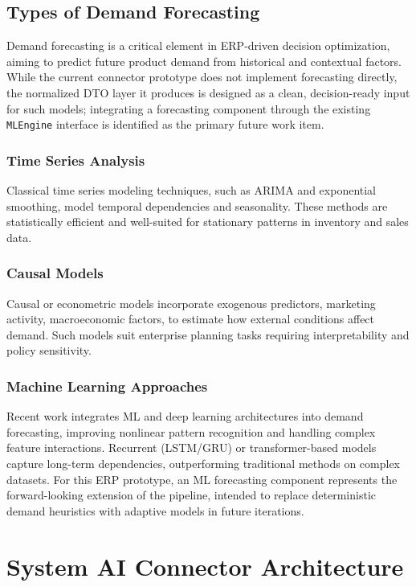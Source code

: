 \documentclass{article}
\begin{document}
\subsection{Types of Demand Forecasting}
Demand forecasting is a critical element in ERP-driven decision optimization, aiming to predict
future product demand from historical and contextual factors.
While the current connector prototype does not implement forecasting directly, the normalized
DTO layer it produces is designed as a clean, decision-ready input for such models; integrating
a forecasting component through the existing \texttt{MLEngine} interface is identified as the
primary future work item.

\subsubsection{Time Series Analysis}
Classical time series modeling techniques, such as ARIMA and exponential smoothing, model
temporal dependencies and seasonality.\autocite{hyndman2018forecasting}
These methods are statistically efficient and well-suited for stationary patterns in inventory
and sales data.

\subsubsection{Causal Models}
Causal or econometric models incorporate exogenous predictors, marketing activity,
macroeconomic factors, to estimate how external conditions affect demand.\autocite{stock2001vector}
Such models suit enterprise planning tasks requiring interpretability and policy sensitivity.

\subsubsection{Machine Learning Approaches}
Recent work integrates ML and deep learning architectures into demand forecasting, improving
nonlinear pattern recognition and handling complex feature interactions.\autocite{bandara2020lstm}
Recurrent (LSTM/GRU) or transformer-based models capture long-term dependencies, outperforming
traditional methods on complex datasets.
For this ERP prototype, an ML forecasting component represents the forward-looking extension
of the pipeline, intended to replace deterministic demand heuristics with adaptive models in
future iterations.

\section{System AI Connector Architecture}
\end{document}
